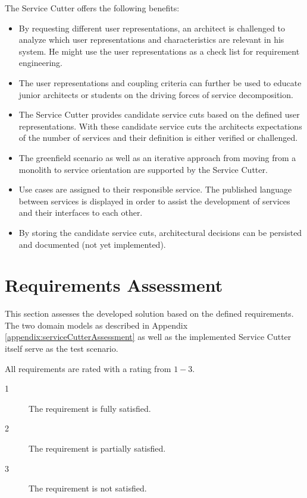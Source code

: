 The Service Cutter offers the following benefits:

\begin{itemize}
	\item By requesting different user representations, an architect is challenged to analyze which user representations and characteristics are relevant in his system. He might use the user representations as a check list for requirement engineering.
	\item The user representations and coupling criteria can further be used to educate junior architects or students on the driving forces of service decomposition.
	\item The Service Cutter provides candidate service cuts based on the defined user representations. With these candidate service cuts the architects expectations of the number of services and their definition is either verified or challenged. 
	\item The greenfield scenario as well as an iterative approach from moving from a monolith to service orientation are supported by the Service Cutter.
	\item Use cases are assigned to their responsible service. The published language between services is displayed in order to assist the development of services and their interfaces to each other.
	\item By storing the candidate service cuts, architectural decisions can be persisted and documented (not yet implemented).
\end{itemize}

\section{Requirements Assessment}

This section assesses the developed solution based on the defined requirements. The two domain models as described in Appendix \ref{appendix:serviceCutterAssessment} as well as the implemented Service Cutter itself serve as the test scenario.

All requirements are rated with a rating from $1-3$.

\begin{description}
\item[1] The requirement is fully satisfied.
\item[2] The requirement is partially satisfied.
\item[3] The requirement is not satisfied.
\end{description}

